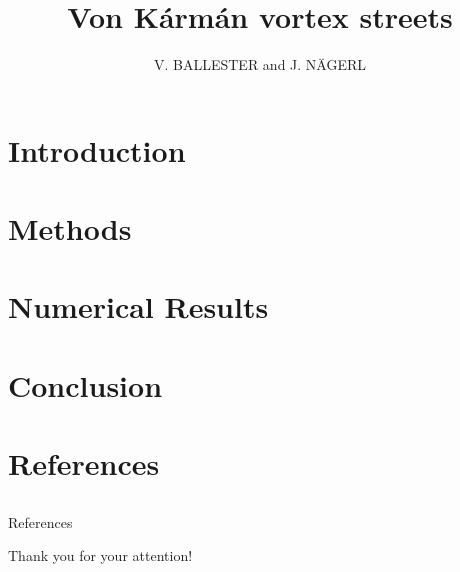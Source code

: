 \documentclass[10pt,compress,xcolor=table]{beamer}
\title{Von Kármán vortex streets}
\date{\formatdate{08}{03}{2024}}
\author{V. BALLESTER and J. NÄGERL}
\begin{document}
\begin{frame}[plain]
  \titlepage
  \setcounter{framenumber}{0}
\end{frame}

\section{Introduction}


\section{Methods}


\section{Numerical Results}


\section{Conclusion}





\section{References} \subsection{}

\begin{frame}[allowframebreaks]{References}

  \printbibliography[heading=none]

\end{frame}

\begin{frame}
  \begin{center}
    \Large Thank you for your attention!
  \end{center}
\end{frame}
\end{document}

